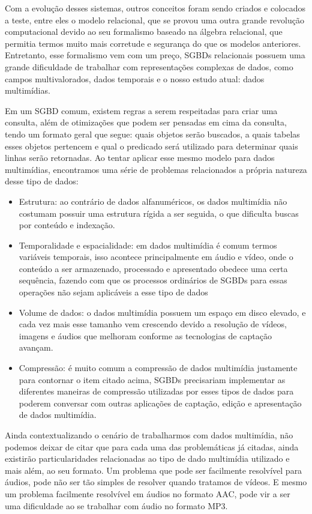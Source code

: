 \documentclass[12pt]{article}
\begin{document}
Com a evolução desses sistemas, outros conceitos foram sendo criados e colocados a teste, entre eles o modelo relacional, que se provou uma outra grande revolução computacional devido ao seu formalismo baseado na álgebra relacional, que permitia termos muito mais corretude e segurança do que os modelos anteriores.
Entretanto, esse formalismo vem com um preço, SGBDs relacionais possuem uma grande dificuldade de trabalhar com representações complexas de dados, como campos multivalorados, dados temporais e o nosso estudo atual: dados multimídias.

Em um SGBD comum, existem regras a serem respeitadas para criar uma consulta, além de otimizações que podem ser pensadas em cima da consulta, tendo um formato geral que segue: quais objetos serão buscados, a quais tabelas esses objetos pertencem e qual o predicado será utilizado para determinar quais linhas serão retornadas.
Ao tentar aplicar esse mesmo modelo para dados multimídias, encontramos uma série de problemas relacionados a própria natureza desse tipo de dados:

\begin{itemize}
    \item Estrutura: ao contrário de dados alfanuméricos, os dados multimídia não costumam possuir uma estrutura rígida a ser seguida, o que dificulta buscas por conteúdo e indexação.
    \item Temporalidade e espacialidade: em dados multimídia é comum termos variáveis temporais, isso acontece principalmente em áudio e vídeo, onde o conteúdo a ser armazenado, processado e apresentado obedece uma certa sequência, fazendo com que os processos ordinários de SGBDs para essas operações não sejam aplicáveis a esse tipo de dados
    \item Volume de dados: o dados multimídia possuem um espaço em disco elevado, e cada vez mais esse tamanho vem crescendo devido a resolução de vídeos, imagens e áudios que melhoram conforme as tecnologias de captação avançam.
    \item Compressão: é muito comum a compressão de dados multimídia justamente para contornar o item citado acima, SGBDs precisariam implementar as diferentes maneiras de compressão utilizadas por esses tipos de dados para poderem conversar com outras aplicações de captação, edição e apresentação de dados multimídia.
\end{itemize}

Ainda contextualizando o cenário de trabalharmos com dados multimídia, não podemos deixar de citar que para cada uma das problemáticas já citadas, ainda existirão particularidades relacionadas ao tipo de dado multimídia utilizado e mais além, ao seu formato. 
Um problema que pode ser facilmente resolvível para áudios, pode não ser tão simples de resolver quando tratamos de vídeos. E mesmo um problema facilmente resolvível em áudios no formato AAC, pode vir a ser uma dificuldade ao se trabalhar com áudio no formato MP3.
\end{document}
